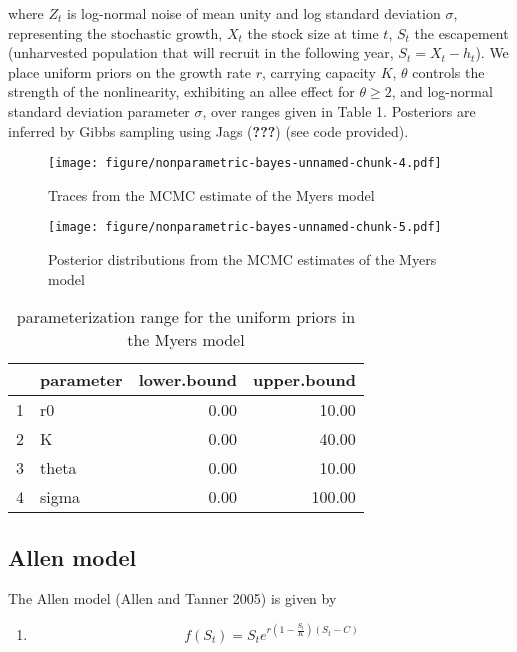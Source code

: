 \documentclass[author-year, review]{elsarticle} %
\makeatletter
\def\maxwidth{\ifdim\Gin@nat@width>\linewidth\linewidth
\else\Gin@nat@width\fi}
\let\Oldincludegraphics\includegraphics
\renewcommand{\includegraphics}[1]{\Oldincludegraphics[width=\maxwidth]{#1}}
\makeatother
\begin{document}
where $Z_t$ is log-normal noise of mean unity and log standard deviation
$\sigma$, representing the stochastic growth, $X_t$ the stock size at
time $t$, $S_t$ the escapement (unharvested population that will recruit
in the following year, $S_t = X_t - h_t$). We place uniform priors on
the growth rate $r$, carrying capacity $K$, $\theta$ controls the
strength of the nonlinearity, exhibiting an allee effect for
$\theta \geq 2$, and log-normal standard deviation parameter $\sigma$,
over ranges given in Table 1. Posteriors are inferred by Gibbs sampling
using Jags ({\textbf{???}}) (see code provided).

\begin{figure}[htbp]
\centering
\texttt{[image: figure/nonparametric-bayes-unnamed-chunk-4.pdf]}
\caption{Traces from the MCMC estimate of the Myers model}
\end{figure}

\begin{figure}[htbp]
\centering
\texttt{[image: figure/nonparametric-bayes-unnamed-chunk-5.pdf]}
\caption{Posterior distributions from the MCMC estimates of the Myers
model}
\end{figure}

\begin{table}[ht]
\begin{center}
\begin{tabular}{rlrr}
  \hline
 & parameter & lower.bound & upper.bound \\ 
  \hline
1 & r0 & 0.00 & 10.00 \\ 
  2 & K & 0.00 & 40.00 \\ 
  3 & theta & 0.00 & 10.00 \\ 
  4 & sigma & 0.00 & 100.00 \\ 
   \hline
\end{tabular}
\caption{parameterization range for the uniform priors in the Myers model}
\end{center}
\end{table}

\subsection{Allen model}\label{allen-model}

The Allen model (Allen and Tanner 2005) is given by

\begin{enumerate}
\def\labelenumi{(\arabic{enumi})}
\setcounter{enumi}{2}
\itemsep1pt\parskip0pt
\item
  \[f(S_t) = S_t e^{r \left(1 - \frac{S_t}{K}\right)\left(S_t - C\right)} \]
\end{enumerate}
\end{document}
